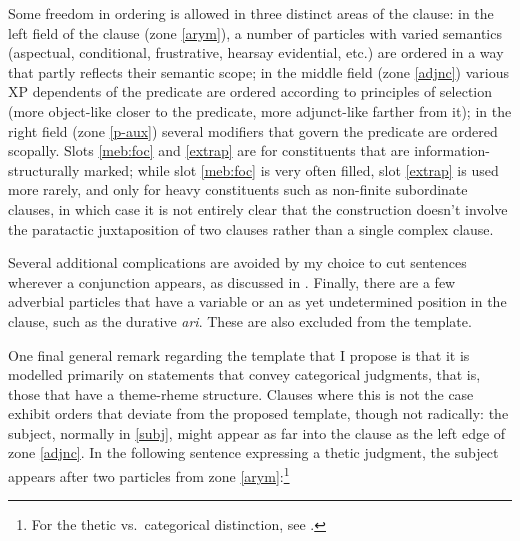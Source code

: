 \documentclass[output=paper]{langscibook}
\begin{document}
Some freedom in ordering is allowed in three distinct areas of the clause: in the left field of the clause (zone \ref{arym}), a number of particles with varied semantics (aspectual, conditional, frustrative, hearsay evidential, etc.) are ordered in a way that partly reflects their semantic scope; in the middle field (zone \ref{adjnc}) various XP dependents of the predicate are ordered according to principles of selection (more object-like closer to the predicate, more adjunct-like farther from it); in the right field (zone \ref{p-aux}) several modifiers that govern the predicate are ordered scopally. Slots \ref{meb:foc} and \ref{extrap} are for constituents that are information-structurally marked; while slot \ref{meb:foc} is very often filled, slot \ref{extrap} is used more rarely, and only for heavy constituents such as non-finite subordinate clauses, in which case it is not entirely clear that the construction doesn't involve the paratactic juxtaposition of two clauses rather than a single complex clause.

Several additional complications are avoided by my choice to cut sentences wherever a conjunction appears, as discussed in . Finally, there are a few adverbial particles that have a variable or an as yet undetermined position in the clause, such as the durative {\em ari}. These are also excluded from the template. %

One final general remark regarding the template that I propose is that it is modelled primarily on statements that convey categorical judgments, that is, those that have a theme-rheme structure. Clauses where this is not the case exhibit orders that deviate from the proposed template, though not radically: the subject, normally in \ref{subj}, might appear as far into the clause as the left edge of zone \ref{adjnc}. In the following sentence expressing a thetic judgment, the subject appears after two particles from zone \ref{arym}:\footnote{For the thetic vs.\ categorical distinction, see \citet{kuroda:thetic}.} %
\end{document}
